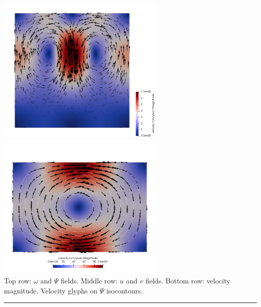 \begin{center}
\includegraphics[width=8cm]{python_codes/fieldstone_153/results/exp1/vel}
\includegraphics[width=8cm]{python_codes/fieldstone_153/results/exp1/vel2}\\
{\captionfont Top row: $\omega$ and $\Psi$ fields.
Middle row: $u$ and $v$ fields. 
Bottom row: velocity magnitude. Velocity glyphs on $\Psi$ isocontours.}
\end{center}










\par\noindent\rule{\textwidth}{0.4pt}

\vspace{.5cm}

\begin{center}
\end{center}




